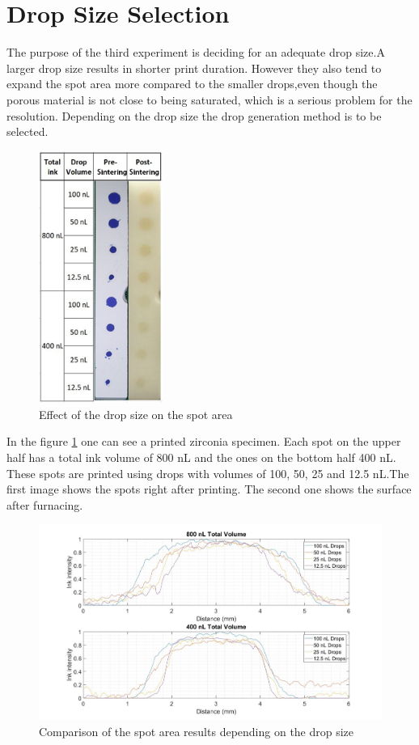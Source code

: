 \section{Drop Size Selection}
The purpose of the third experiment is deciding for an adequate drop size.A larger drop size results in shorter print duration. However they also tend to expand the spot area more compared to the smaller drops,even though the porous material is not close to being saturated, which is a serious problem for the resolution. Depending on the drop size the drop generation method is to be selected. 
\bigskip
\begin{figure}[H]
	\centering
	\includegraphics[width=0.36\textwidth]{grafiken/DropSize.jpg}
	\caption{Effect of the drop size on the spot area}
	\label{fig:DropSize}
\end{figure} 
\bigskip
In the figure \ref{fig:DropSize} one can see a printed zirconia specimen. Each spot on the upper half has a total ink volume of 800 nL and the ones on the bottom half 400 nL. These spots are printed using drops with volumes of 100, 50, 25 and 12.5 nL.The first image shows the spots right after printing. The second one shows the surface after furnacing.

\bigskip

\begin{figure}[H]
	\centering
	\includegraphics[width=1\textwidth]{grafiken/SpotArea.jpg}
	\caption{Comparison of the spot area results depending on the drop size}
	\label{fig:SpotArea}
\end{figure} 

